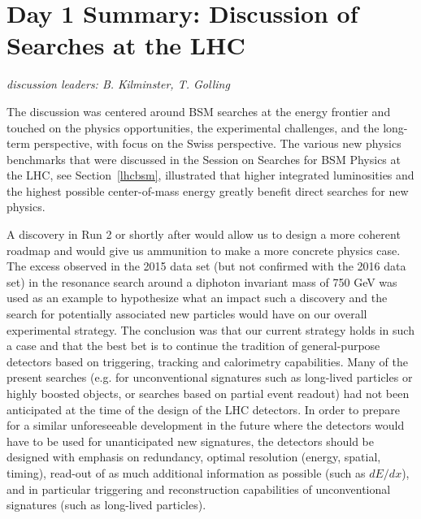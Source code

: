 \section{Day 1 Summary: Discussion of Searches at the LHC}\label{discussionsearches}{\it discussion leaders: B. Kilminster, T. Golling}


\noindent The discussion was centered around BSM searches at the energy frontier and touched on the physics opportunities, the experimental challenges, and the long-term perspective, with focus on the Swiss perspective.
The various new physics benchmarks that were discussed in the Session on Searches for BSM Physics at the LHC, see Section~\ref{lhcbsm}, illustrated that higher integrated luminosities and the highest possible 
center-of-mass energy greatly benefit direct searches for new physics.
\medskip

\noindent  A discovery in Run 2 or shortly after would allow us to design a more coherent roadmap and would give us ammunition to make a more concrete physics case.  The excess observed in the 2015 data set (but not confirmed with the 2016 data set) in the resonance search around a diphoton invariant mass of 750 GeV was used as an example to hypothesize what an impact such a discovery and the search for potentially associated new particles would have on our overall experimental strategy.  The conclusion was that our current strategy holds in such a case and that the best bet is to continue the tradition of general-purpose detectors based on triggering, tracking and calorimetry capabilities.  Many of the present searches (e.g. for unconventional signatures such as long-lived particles or highly boosted objects, or searches based on partial event readout) had not been anticipated at the time of the design of the LHC detectors.  In order to prepare for a similar unforeseeable development in the future where the detectors would have to be used for unanticipated new signatures, the detectors should be designed with emphasis on redundancy, optimal resolution (energy, spatial, timing), read-out of as much additional information as possible (such as $dE/dx$), and in particular triggering and reconstruction capabilities of unconventional signatures (such as long-lived particles).
\medskip

